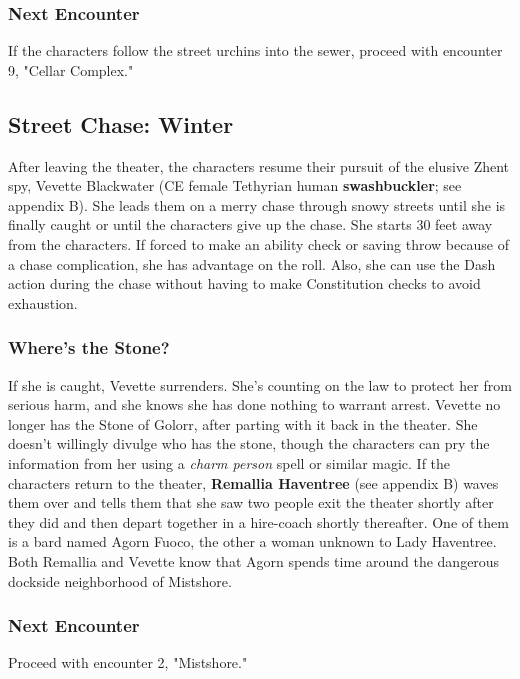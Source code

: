 \documentclass[10pt,a4paper,twoside,twocolumn,openany,nodeprecatedcode]{dndbook}
\begin{document}
\subsubsection{Next Encounter}
If the characters follow the street urchins into the sewer, proceed with encounter 9, "Cellar Complex."
\subsection{Street Chase: Winter}
After leaving the theater, the characters resume their pursuit of the elusive Zhent spy, Vevette Blackwater (CE female Tethyrian human \textbf{swashbuckler}; see appendix B). She leads them on a merry chase through snowy streets until she is finally caught or until the characters give up the chase. She starts 30 feet away from the characters. If forced to make an ability check or saving throw because of a chase complication, she has advantage on the roll. Also, she can use the Dash action during the chase without having to make Constitution checks to avoid exhaustion.
\subsubsection{Where's the Stone?}
If she is caught, Vevette surrenders. She's counting on the law to protect her from serious harm, and she knows she has done nothing to warrant arrest. Vevette no longer has the Stone of Golorr, after parting with it back in the theater. She doesn't willingly divulge who has the stone, though the characters can pry the information from her using a \textit{charm person} spell or similar magic.
If the characters return to the theater, \textbf{Remallia Haventree} (see appendix B) waves them over and tells them that she saw two people exit the theater shortly after they did and then depart together in a hire-coach shortly thereafter. One of them is a bard named Agorn Fuoco, the other a woman unknown to Lady Haventree.
Both Remallia and Vevette know that Agorn spends time around the dangerous dockside neighborhood of Mistshore.
\subsubsection{Next Encounter}
Proceed with encounter 2, "Mistshore."
\end{document}
